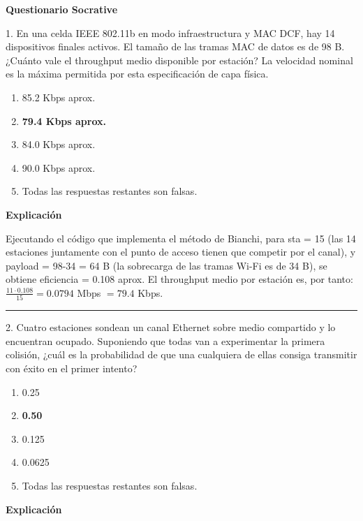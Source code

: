 \documentclass[10pt,a4paper]{article}
\begin{document}
\begin{center}
  \bfseries\Huge Questionario Socrative
\end{center}
\vspace{20pt}

1. En una celda IEEE 802.11b en modo infraestructura y MAC DCF, hay 14 dispositivos finales activos.
El tamaño de las tramas MAC de datos es de 98 B. ¿Cuánto vale el throughput medio disponible por estación?
La velocidad nominal es la máxima permitida por esta especificación de capa física.

\begin{enumerate}[label=\alph*]
    \item 85.2 Kbps aprox.
    \item \textbf{79.4 Kbps aprox.}
    \item 84.0 Kbps aprox.
    \item 90.0 Kbps aprox.
    \item Todas las respuestas restantes son falsas.
\end{enumerate}

\textbf{Explicación}

Ejecutando el código que implementa el método de Bianchi, para sta = 15 (las 14 estaciones juntamente con el
punto de acceso tienen que competir por el canal), y payload = 98-34 = 64 B (la sobrecarga de las tramas Wi-Fi
es de 34 B), se obtiene eficiencia = 0.108 aprox. El throughput medio por estación es, por tanto: 
$\frac{11\cdot0.108}{15} = 0.0794$ Mbps $= 79.4$ Kbps.

\vspace{15pt} \hrule \vspace{15pt}




2. Cuatro estaciones sondean un canal Ethernet sobre medio compartido y lo encuentran ocupado.
Suponiendo que todas van a experimentar la primera colisión, ¿cuál es la probabilidad de que una cualquiera de
ellas consiga transmitir con éxito en el primer intento?


\begin{enumerate}[label=\alph*]
    \item 0.25
    \item \textbf{0.50}
    \item 0.125
    \item 0.0625
    \item Todas las respuestas restantes son falsas.
\end{enumerate}

\textbf{Explicación}
\end{document}
